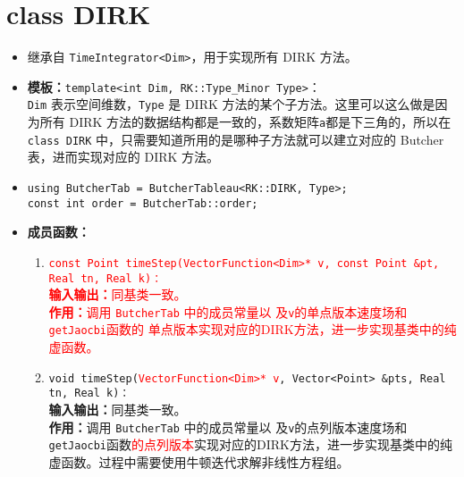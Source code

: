 \documentclass[a4paper,twoside]{ctexart}
\begin{document}
\section{class DIRK}
\begin{itemize}
    \item 继承自 \texttt{TimeIntegrator<Dim>}，用于实现所有 DIRK 方法。
    \item \textbf{模板：}\texttt{template<int Dim, RK::Type\_Minor Type>}：\\\texttt{Dim} 表示空间维数，\texttt{Type} 是 DIRK 方法的某个子方法。这里可以这么做是因为所有 DIRK 方法的数据结构都是一致的，系数矩阵\texttt{a}都是下三角的，所以在 \texttt{class DIRK} 中，只需要知道所用的是哪种子方法就可以建立对应的 Butcher 表，进而实现对应的 DIRK 方法。
    \item \texttt{using ButcherTab = ButcherTableau<RK::DIRK, Type>;\\
    const int order = ButcherTab::order;}
    \item \textbf{成员函数：}
      \begin{enumerate}[(1)]
        \item \textcolor{red}{
          \texttt{const Point timeStep(VectorFunction<Dim>* v,
            const Point \&pt, Real tn, Real k)：}\\
          \textbf{输入输出：}同基类一致。\\
                \textbf{作用：}调用 \texttt{ButcherTab} 中的成员常量以
                及\texttt{v}的单点版本速度场和\texttt{getJaocbi}函数的
                单点版本实现对应的DIRK方法，进一步实现基类中的纯虚函数。
          }
                \item \texttt{void timeStep(}\textcolor{red}{\texttt{VectorFunction<Dim>* v}}\texttt{, Vector<Point> \&pts, Real tn, Real k)：}\\
                \textbf{输入输出：}同基类一致。\\
                \textbf{作用：}调用 \texttt{ButcherTab} 中的成员常量以
                及\texttt{v}的点列版本速度场和\texttt{getJaocbi}函数\textcolor{red}{的点列版本}实现对应的DIRK方法，进一步实现基类中的纯虚函数。过程中需要使用牛顿迭代求解非线性方程组。
            \end{enumerate}
\end{itemize}
\end{document}
